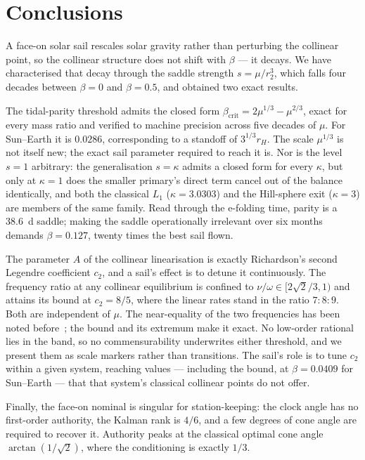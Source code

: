 \documentclass[11pt,a4paper]{article}
\begin{document}
\section{Conclusions}

A face-on solar sail rescales solar gravity rather than perturbing the collinear
point, so the collinear structure does not shift with $\beta$ --- it decays. We
have characterised that decay through the saddle strength $s=\mu/r_2^3$, which
falls four decades between $\beta=0$ and $\beta=0.5$, and obtained two exact
results.

The tidal-parity threshold admits the closed form
$\beta_{\mathrm{crit}}=2\mu^{1/3}-\mu^{2/3}$, exact for every mass ratio and
verified to machine precision across five decades of $\mu$. For Sun--Earth it is
$0.0286$, corresponding to a standoff of $3^{1/3}r_H$. The scale $\mu^{1/3}$ is
not itself new; the exact sail parameter required to reach it is. Nor is the
level $s=1$ arbitrary: the generalisation $s=\kappa$ admits a closed form for
every $\kappa$, but only at $\kappa=1$ does the smaller primary's direct term
cancel out of the balance identically, and both the classical $L_1$
($\kappa=3.0303$) and the Hill-sphere exit ($\kappa=3$) are members of the same
family. Read through the e-folding time, parity is a \SI{38.6}{\day} saddle;
making the saddle operationally irrelevant over six months demands
$\beta=0.127$, twenty times the best sail flown.

The parameter $A$ of the collinear linearisation is exactly Richardson's
second Legendre coefficient $c_2$, and a sail's effect is to detune it
continuously. The frequency ratio at any collinear equilibrium is confined to
$\nu/\omega\in[2\sqrt2/3,1)$ and attains its bound at $c_2=8/5$, where the
linear rates stand in the ratio $7:8:9$. Both are independent of $\mu$. The
near-equality of the two frequencies has been noted
before~\cite{ceccaroni2016}; the bound and its extremum make it exact. No
low-order rational lies in the band, so no commensurability underwrites either
threshold, and we present them as scale markers rather than transitions. The
sail's role is to tune $c_2$ within a given system, reaching values ---
including the bound, at $\beta=0.0409$ for Sun--Earth --- that that system's
classical collinear points do not offer.

Finally, the face-on nominal is singular for station-keeping: the clock angle
has no first-order authority, the Kalman rank is $4/6$, and a few degrees of
cone angle are required to recover it. Authority peaks at the classical optimal
cone angle $\arctan(1/\sqrt2)$, where the conditioning is exactly $1/3$.
\end{document}
